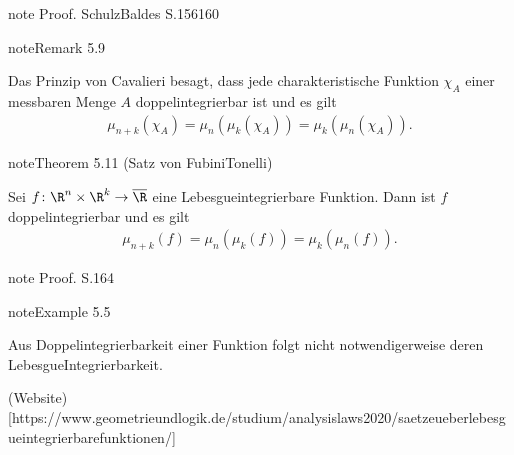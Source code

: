 \documentclass[letterpaper,10pt,english]{jupyterBook}
\begin{document}
\begin{sphinxadmonition}{note}
\sphinxAtStartPar
Proof. Schulz\sphinxhyphen{}Baldes S.156\sphinxhyphen{}160
\end{sphinxadmonition}
\label{masstheorie/integrationstechnik:remark-3}
\begin{sphinxadmonition}{note}{Remark 5.9}



\sphinxAtStartPar
Das Prinzip von Cavalieri besagt, dass jede charakteristische Funktion \(\chi_A\) einer messbaren Menge \(A\) doppelintegrierbar ist und es gilt
\begin{equation*}
\begin{split}\mu_{n+k}(\chi_A) = \mu_n(\mu_k(\chi_A)) = \mu_k(\mu_n(\chi_A)). \end{split}
\end{equation*}\end{sphinxadmonition}
\label{masstheorie/integrationstechnik:theorem-4}
\begin{sphinxadmonition}{note}{Theorem 5.11 (Satz von Fubini\sphinxhyphen{}Tonelli)}



\sphinxAtStartPar
Sei \(f \colon \R^{n} \times \R^k \rightarrow \overline{\R}\) eine Lebesgue\sphinxhyphen{}integrierbare Funktion.
Dann ist \(f\) doppelintegrierbar und es gilt
\begin{equation*}
\begin{split}\mu_{n+k}(f) = \mu_n(\mu_k(f)) = \mu_k(\mu_n(f)). \end{split}
\end{equation*}\end{sphinxadmonition}

\begin{sphinxadmonition}{note}
\sphinxAtStartPar
Proof. S.164
\end{sphinxadmonition}
\label{masstheorie/integrationstechnik:example-5}
\begin{sphinxadmonition}{note}{Example 5.5}



\sphinxAtStartPar
Aus Doppelintegrierbarkeit einer Funktion folgt nicht notwendigerweise deren Lebesgue\sphinxhyphen{}Integrierbarkeit.

\sphinxAtStartPar
(Website){[}https://www.geometrie\sphinxhyphen{}und\sphinxhyphen{}logik.de/studium/analysis\sphinxhyphen{}la\sphinxhyphen{}ws\sphinxhyphen{}2020/saetze\sphinxhyphen{}ueber\sphinxhyphen{}lebesgueintegrierbare\sphinxhyphen{}funktionen/{]}
\end{sphinxadmonition}
\end{document}
